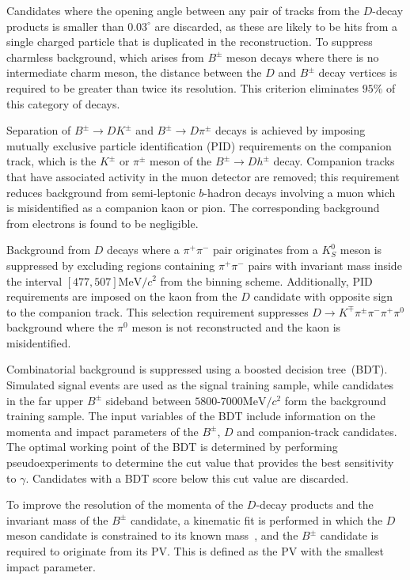 \documentclass[12pt, a4paper, notitlepage, onecolumn]{article}
\begin{document}
Candidates where the opening angle between any pair of tracks from the $D$-decay products is smaller than $0.03^\circ$ are discarded, as these are likely to be hits from a single charged particle that is duplicated in the reconstruction. To suppress charmless background, which arises from $B^\pm$ meson decays where there is no intermediate charm meson, the distance between the $D$ and $B^\pm$ decay vertices is required to be greater than twice its resolution. This criterion eliminates $95\%$ of this category of decays.

Separation of $B^\pm\to DK^\pm$ and $B^\pm\to D\pi^\pm$ decays is achieved by imposing mutually exclusive particle identification (PID) requirements on the companion track, which is the $K^\pm$ or $\pi^\pm$ meson of the $B^\pm\to Dh^\pm$ decay. Companion tracks that have associated activity in the muon detector are removed; this requirement reduces background from semi-leptonic $b$-hadron decays involving a muon which is misidentified as a companion kaon or pion. The corresponding background from electrons is found to be negligible.  

Background from $D$ decays where a $\pi^+\pi^-$ pair originates from a $K^0_S$ meson is suppressed by excluding regions containing $\pi^+\pi^-$ pairs with invariant mass inside the interval $[477, 507]\si{\mega\eV/c^2}$ from the binning scheme. Additionally, PID requirements are imposed on the kaon from the $D$ candidate with opposite sign to the companion track. This selection requirement suppresses $D\to K^\mp\pi^\pm\pi^-\pi^+\pi^0$ background where the $\pi^0$ meson is not reconstructed and the kaon is misidentified. 

Combinatorial background is suppressed using a boosted decision tree~(BDT). Simulated signal events are used as the signal training sample, while candidates in the far upper $B^\pm$ sideband between $5800$-$7000\si{\mega\eV/c^2}$ form the background training sample. The input variables of the BDT include information on the momenta and impact parameters of the $B^\pm$, $D$ and companion-track candidates. The optimal working point of the BDT is determined by performing pseudoexperiments to determine the cut value that provides the best sensitivity to $\gamma$. Candidates with a BDT score below this cut value are discarded.

To improve the resolution of the momenta of the $D$-decay products and the invariant mass of the $B^\pm$ candidate, a kinematic fit is performed in which the $D$ meson candidate is constrained to its known mass~\cite{pdg}, and the $B^\pm$ candidate is required to originate from its PV. This is defined as the PV with the smallest impact parameter.
\end{document}
